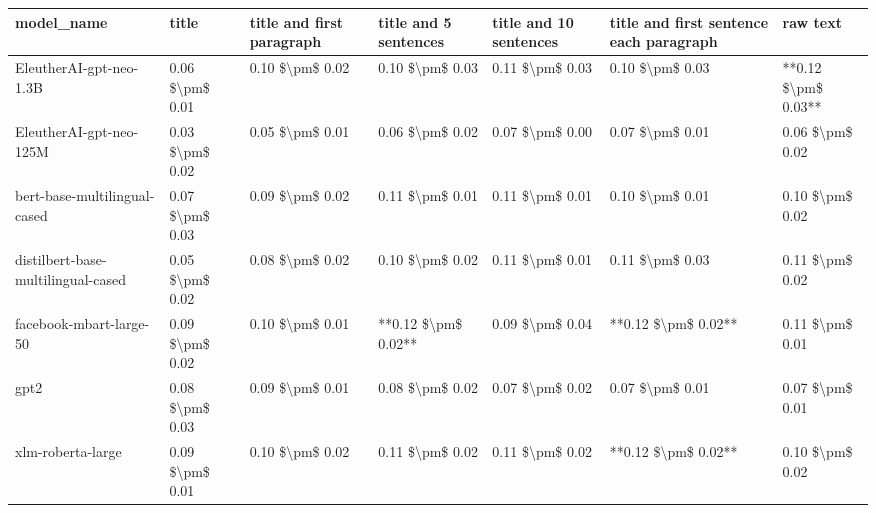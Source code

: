 \begin{tabular}{lllllll}
\toprule
                        model\_name &           title & title and first paragraph & title and 5 sentences & title and 10 sentences & title and first sentence each paragraph &            raw text \\
\midrule
           EleutherAI-gpt-neo-1.3B & 0.06 \$\textbackslash pm\$ 0.01 &           0.10 \$\textbackslash pm\$ 0.02 &       0.10 \$\textbackslash pm\$ 0.03 &        0.11 \$\textbackslash pm\$ 0.03 &                         0.10 \$\textbackslash pm\$ 0.03 & **0.12 \$\textbackslash pm\$ 0.03** \\
           EleutherAI-gpt-neo-125M & 0.03 \$\textbackslash pm\$ 0.02 &           0.05 \$\textbackslash pm\$ 0.01 &       0.06 \$\textbackslash pm\$ 0.02 &        0.07 \$\textbackslash pm\$ 0.00 &                         0.07 \$\textbackslash pm\$ 0.01 &     0.06 \$\textbackslash pm\$ 0.02 \\
      bert-base-multilingual-cased & 0.07 \$\textbackslash pm\$ 0.03 &           0.09 \$\textbackslash pm\$ 0.02 &       0.11 \$\textbackslash pm\$ 0.01 &        0.11 \$\textbackslash pm\$ 0.01 &                         0.10 \$\textbackslash pm\$ 0.01 &     0.10 \$\textbackslash pm\$ 0.02 \\
distilbert-base-multilingual-cased & 0.05 \$\textbackslash pm\$ 0.02 &           0.08 \$\textbackslash pm\$ 0.02 &       0.10 \$\textbackslash pm\$ 0.02 &        0.11 \$\textbackslash pm\$ 0.01 &                         0.11 \$\textbackslash pm\$ 0.03 &     0.11 \$\textbackslash pm\$ 0.02 \\
           facebook-mbart-large-50 & 0.09 \$\textbackslash pm\$ 0.02 &           0.10 \$\textbackslash pm\$ 0.01 &   **0.12 \$\textbackslash pm\$ 0.02** &        0.09 \$\textbackslash pm\$ 0.04 &                     **0.12 \$\textbackslash pm\$ 0.02** &     0.11 \$\textbackslash pm\$ 0.01 \\
                              gpt2 & 0.08 \$\textbackslash pm\$ 0.03 &           0.09 \$\textbackslash pm\$ 0.01 &       0.08 \$\textbackslash pm\$ 0.02 &        0.07 \$\textbackslash pm\$ 0.02 &                         0.07 \$\textbackslash pm\$ 0.01 &     0.07 \$\textbackslash pm\$ 0.01 \\
                 xlm-roberta-large & 0.09 \$\textbackslash pm\$ 0.01 &           0.10 \$\textbackslash pm\$ 0.02 &       0.11 \$\textbackslash pm\$ 0.02 &        0.11 \$\textbackslash pm\$ 0.02 &                     **0.12 \$\textbackslash pm\$ 0.02** &     0.10 \$\textbackslash pm\$ 0.02 \\
\bottomrule
\end{tabular}
